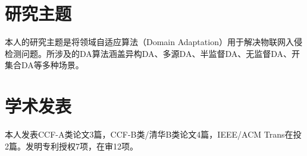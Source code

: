 \documentclass[letterpaper,11pt]{article}
\begin{document}
\vspace{1pt}




\section{研究主题}

本人的研究主题是将领域自适应算法（Domain Adaptation）用于解决物联网入侵检测问题。所涉及的DA算法涵盖异构DA、多源DA、半监督DA、无监督DA、开集合DA等多种场景。

\vspace{1pt}




\section{学术发表}

本人发表CCF-A类论文3篇，CCF-B类/清华B类论文4篇，IEEE/ACM Trans在投2篇。发明专利授权7项，在审12项。
\end{document}
